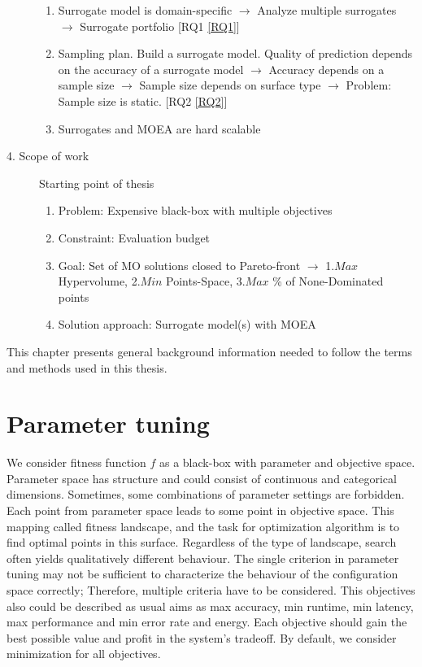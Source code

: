\begin{blockquote}
\begin{description}
\begin{enumerate}
                    \item Surrogate model is domain-specific $\rightarrow$ Analyze multiple surrogates $\rightarrow$ Surrogate portfolio [RQ1 \ref{RQ1}]
                    \item Sampling plan. Build a surrogate model. Quality of prediction depends on the accuracy of a surrogate model  $\rightarrow$ Accuracy depends on a sample size $\rightarrow$ Sample size depends on surface type $\rightarrow$ Problem: Sample size is static. [RQ2 \ref{RQ2}]
                    \item Surrogates and MOEA are hard scalable 
                \end{enumerate}
            \item[4. Scope of work] Starting point of thesis
                \begin{enumerate}
                    \item Problem: Expensive black-box with multiple objectives
                    \item Constraint: Evaluation budget
                    \item Goal: Set of MO solutions closed to Pareto-front $\rightarrow$ 1.$Max$ Hypervolume, 2.$Min$ Points-Space, 3.$Max$ \% of None-Dominated points 
                    \item Solution approach: Surrogate model(s) with MOEA
                \end{enumerate}
        \end{description}
    \end{blockquote}

    This chapter presents general background information needed to follow the terms and methods used in this thesis. 

    \section{Parameter tuning}
        We consider fitness function $f$ as a black-box with parameter and objective space. Parameter space has structure and could consist of continuous and categorical dimensions. Sometimes, some combinations of parameter settings are forbidden. Each point from parameter space leads to some point in objective space. This mapping called fitness landscape, and the task for optimization algorithm is to find optimal points in this surface. Regardless of the type of landscape, search often yields qualitatively different behaviour.
        The single criterion in parameter tuning may not be sufficient to characterize the behaviour of the configuration space correctly; Therefore, multiple criteria have to be considered. This objectives also could be described as usual aims as max accuracy, min runtime, min latency, max performance and min error rate and energy. Each objective should gain the best possible value and profit in the system's tradeoff. By default, we consider minimization for all objectives. 

